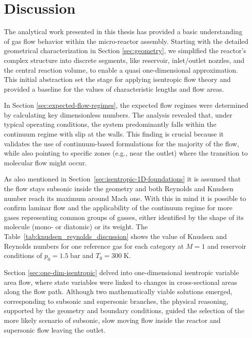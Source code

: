 \section*{Discussion}
The analytical work presented in this thesis has provided a basic understanding of gas flow behavior within the micro-reactor assembly.
Starting with the detailed geometrical characterization in Section \ref{sec:geometry}, we simplified the reactor’s complex structure into discrete segments, like reservoir, inlet/outlet nozzles, and the central reaction volume, to enable a quasi one-dimensional approximation.
This initial abstraction set the stage for applying isentropic flow theory and provided a baseline for the values of characteristic lengths and flow areas.

In Section \ref{sec:expected-flow-regimes}, the expected flow regimes were determined by calculating key dimensionless numbers.
The analysis revealed that, under typical operating conditions, the system predominantly falls within the continuum regime with slip at the walls.
This finding is crucial because it validates the use of continuum-based formulations for the majority of the flow, while also pointing to specific zones (e.g., near the outlet) where the transition to molecular flow might occur.

As also mentioned in Section~\ref{sec:isentropic-1D-foundations} it is assumed that the flow stays subsonic inside the geometry and both Reynolds and Knudsen number reach its maximum around Mach one.
With this in mind it is possible to confirm laminar flow and the applicability of the continuum regime for more gases representing common groups of gasses, either identified by the shape of its molecule (mono- or diatomic) or its weight.
The Table~\ref{tab:knudsen_reynolds_discussion} shows the value of Knudsen and Reynolds numbers for one reference gas for each category at $M = 1$ and reservoir conditions of $p_0 = 1.5 \; \text{bar}$ and $T_0 = 300\;\text{K}$.



Section \ref{sec:one-dim-isentropic} delved into one-dimensional isentropic variable area flow, where state variables were linked to changes in cross-sectional areas along the flow path.
Although two mathematically viable solutions emerged, corresponding to subsonic and supersonic branches, the physical reasoning, supported by the geometry and boundary conditions, guided the selection of the more likely scenario of subsonic, slow moving flow inside the reactor and supersonic flow leaving the outlet.

